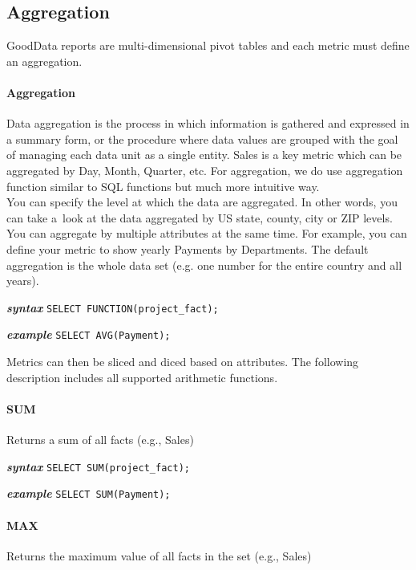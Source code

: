 \documentclass[a4paper, 12pt, titlepage, fleqn]{article}
\begin{document}
\subsection{Aggregation}
GoodData reports are multi-dimensional pivot tables and each metric must define an aggregation.
\paragraph*{Aggregation} Data aggregation is the process in which information is gathered and expressed in a summary form, or the procedure where data values are grouped with the goal of managing each data unit as a single entity. Sales is a key metric which can be aggregated by Day, Month, Quarter, etc. For aggregation, we do use aggregation function similar to SQL functions but much more intuitive way.\\

You can specify the level at which the data are aggregated. In other words, you can take a~look at the data aggregated by US state, county, city or ZIP levels. You can aggregate by multiple attributes at the same time. For example, you can define your metric to show yearly Payments by Departments. The default aggregation is the whole data set (e.g. one number for the entire country and all years).

\textbf{\emph{syntax}}  \hspace{.9cm}\verb=SELECT FUNCTION(project_fact);=

\textbf{\emph{example}}  \hspace{.55cm}\verb=SELECT AVG(Payment);=

Metrics can then be sliced and diced based on attributes. The following description includes all supported arithmetic functions.

\paragraph*{SUM} Returns a sum of all facts (e.g., Sales)

\textbf{\emph{syntax}}  \hspace{.9cm}\verb=SELECT SUM(project_fact);=

\textbf{\emph{example}}  \hspace{.6cm}\verb=SELECT SUM(Payment);=

\paragraph*{MAX} Returns the maximum value of all facts in the set (e.g., Sales)
\end{document}
